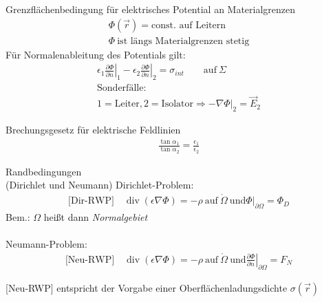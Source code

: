\documentclass[a6paper]{kartei}
\begin{document}
\begin{karte}{Grenzflächenbedingung für elektrisches Potential an Materialgrenzen}
\begin{eqnarray*}
 \Phi(\vec{r}) = \text{const. auf Leitern} \\
 \Phi \ \text{ist längs Materialgrenzen stetig}
\end{eqnarray*}
Für Normalenableitung des Potentials gilt:
 \begin{eqnarray*}
  \left. \epsilon_{1} \frac{\partial \Phi}{\partial n} \right|_{1} - \left. \epsilon_{2} \frac{\partial \Phi}{\partial n} \right|_{2} = 
  \sigma_{int} \qquad \text{auf} \ \Sigma \\
  \text{Sonderfälle:} \nonumber \\
  1 = \text{Leiter}, 2 = \text{Isolator} \Rightarrow \left. -\nabla \Phi \right|_{2} = \vec{E}_{2} %
 \end{eqnarray*}
\end{karte} 

\begin{karte}{Brechungsgesetz für elektrische Feldlinien}
\begin{eqnarray*}
\frac{\operatorname{tan} \alpha_{1}}{\operatorname{tan} \alpha_{2}} = \frac{\epsilon_{1}}{\epsilon_{2}} 
\end{eqnarray*}
\end{karte}


\begin{karte}{Randbedingungen\\(Dirichlet und Neumann)}
Dirichlet-Problem:  
\begin{eqnarray*}
  \text{[Dir-RWP]} \quad \operatorname{div}(\epsilon \nabla \Phi) = - \rho \ \text{auf} \ \mathring{\Omega} 
   \ \text{und} \left. \Phi\right|_{\partial \Omega} = \Phi_{D} 
 \end{eqnarray*}
 Bem.: $\Omega$ heißt dann \emph{Normalgebiet}
\\\ \\Neumann-Problem:
\begin{eqnarray*}
 \text{[Neu-RWP]} \quad \operatorname{div}(\epsilon \nabla \Phi) = - \rho \ \text{auf} \ \mathring{\Omega} 
   \ \text{und} \left. \frac{\partial \Phi}{\partial n}\right|_{\partial \Omega} = F_{N} 
\end{eqnarray*}

[Neu-RWP] entspricht der Vorgabe einer Oberflächenladungsdichte $\sigma(\vec{r})$

\end{karte}
\end{document}
